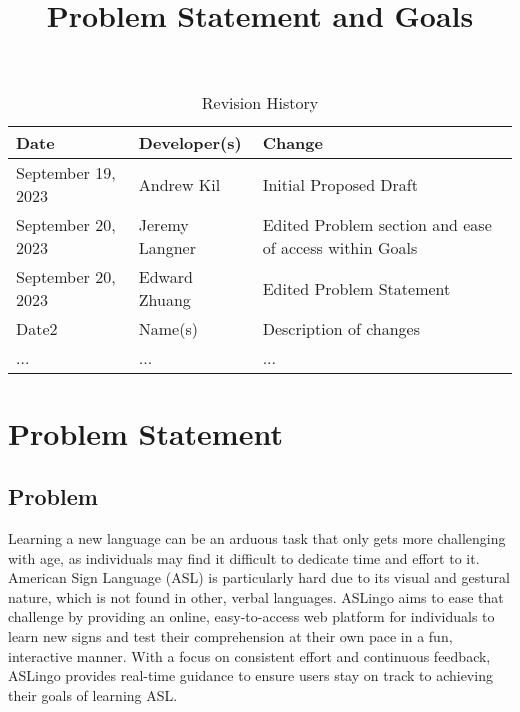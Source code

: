 \documentclass{article}
\title{Problem Statement and Goals\\\progname}
\author{\authname}
\date{}
\begin{document}
\maketitle

\begin{table}[hp]
\caption{Revision History} \label{TblRevisionHistory}
\begin{tabularx}{\textwidth}{llX}
\toprule
\textbf{Date} & \textbf{Developer(s)} & \textbf{Change}\\
\midrule
September 19, 2023 & Andrew Kil & Initial Proposed Draft\\
September 20, 2023 & Jeremy Langner & Edited Problem section and ease of access within Goals\\
September 20, 2023 & Edward Zhuang & Edited Problem Statement\\
Date2 & Name(s) & Description of changes\\
... & ... & ...\\
\bottomrule
\end{tabularx}
\end{table}

\section{Problem Statement}



\subsection{Problem}

Learning a new language can be an arduous task that only gets more challenging with age, as individuals may find it difficult to dedicate time and effort to it. American Sign Language (ASL) is particularly hard due to its visual and gestural nature, which is not found in other, verbal languages. ASLingo aims to ease that challenge by providing an online, easy-to-access web platform for individuals to learn new signs and test their comprehension at their own pace in a fun, interactive manner. With a focus on consistent effort and continuous feedback, ASLingo provides real-time guidance to ensure users stay on track to achieving their goals of learning ASL.
\end{document}
